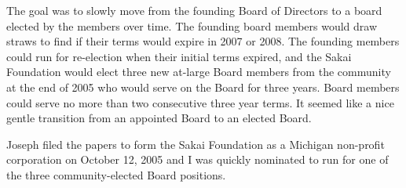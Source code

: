 \documentclass[12pt]{book}
\begin{document}
The goal was to slowly move from the founding Board
of Directors to a board elected by the members over time.
The founding board members would draw straws to find if
their terms would expire in 2007 or 2008.
The founding members could run for re-election when their
initial terms expired,
and the Sakai Foundation would elect three new at-large Board members from
the community at the end of 2005 who would serve on
the Board for three years. Board members could serve no
more than two consecutive three year terms.  It seemed
like a nice gentle transition from an appointed Board
to an elected Board.

Joseph filed the papers to form the Sakai Foundation
as a Michigan non-profit corporation on October 12,
2005 and I was quickly nominated to run for one of the three
community-elected Board positions.
\end{document}
